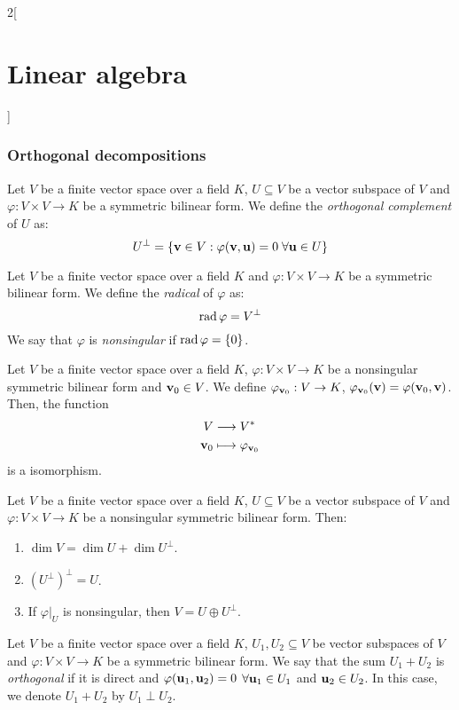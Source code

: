 \documentclass[../../../main.tex]{subfiles}
\begin{document}
\begin{multicols}{2}[\section{Linear algebra}]
  \subsubsection{Orthogonal decompositions}
  \begin{definition}\label{LA_singular}
    Let $V$ be a finite vector space over a field $K$, $U\subseteq V$ be a vector subspace of $V$ and $\varphi:V\times V\rightarrow K$ be a symmetric bilinear form. We define the \emph{orthogonal complement} of $U$ as: $$U^\perp=\{\boldsymbol{\mathrm{v}}\in V:\varphi(\boldsymbol{\mathrm{v}},\boldsymbol{\mathrm{u}})=0\;\forall\boldsymbol{\mathrm{u}}\in U\}$$
  \end{definition}
  \begin{definition}
    Let $V$ be a finite vector space over a field $K$ and $\varphi:V\times V\rightarrow K$ be a symmetric bilinear form. We define the \emph{radical} of $\varphi$ as: $$\operatorname{rad}\varphi=V^\perp$$ We say that $\varphi$ is \emph{nonsingular} if $\operatorname{rad}\varphi=\{0\}$.
  \end{definition}
  \begin{definition}
    Let $V$ be a finite vector space over a field $K$, $\varphi:V\times V\rightarrow K$ be a nonsingular symmetric bilinear form and $\boldsymbol{\mathrm{v}}_0\in V$. We define $\varphi_{\boldsymbol{\mathrm{v}}_0}:V\rightarrow K$, $\varphi_{\boldsymbol{\mathrm{v}}_0}(\boldsymbol{\mathrm{v}})=\varphi(\boldsymbol{\mathrm{v}}_0,\boldsymbol{\mathrm{v}})$. Then, the function
    \begin{align*}
      V                    & \longrightarrow V^*                       \\
      \boldsymbol{\mathrm{v}}_0 & \longmapsto\varphi_{\boldsymbol{\mathrm{v}}_0}
    \end{align*} is a isomorphism.
  \end{definition}
  \begin{definition}
    Let $V$ be a finite vector space over a field $K$, $U\subseteq V$ be a vector subspace of $V$ and $\varphi:V\times V\rightarrow K$ be a nonsingular symmetric bilinear form. Then:
    \begin{enumerate}
      \item $\dim V=\dim U+\dim U^\perp$.
      \item ${(U^\perp)}^\perp=U$.
      \item If $\varphi|_U$ is nonsingular, then $V=U\oplus U^\perp$.
    \end{enumerate}
  \end{definition}
  \begin{definition}
    Let $V$ be a finite vector space over a field $K$, $U_1,U_2\subseteq V$ be vector subspaces of $V$ and $\varphi:V\times V\rightarrow K$ be a symmetric bilinear form. We say that the sum $U_1+U_2$ is \emph{orthogonal} if it is direct and $\varphi(\boldsymbol{\mathrm{u}}_1,\boldsymbol{\mathrm{u}}_2)=0$ $\forall \boldsymbol{\mathrm{u}}_1\in U_1$ and $\boldsymbol{\mathrm{u}}_2\in U_2$. In this case, we denote $U_1+U_2$ by $U_1\perp U_2$.

\end{definition}
\end{multicols}
\end{document}
